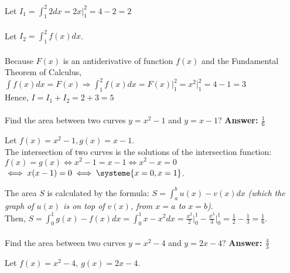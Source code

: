 \documentclass{article}
\begin{document}
    Let $\displaystyle I_1 = \int_{1}^{2} 2 dx = 2x\big|_1^2 = 4 - 2 = 2$\\\\

    Let $\displaystyle I_2 = \int_{1}^{2} f(x) dx$.\\\\

    Because $F(x)$ is an antiderivative of function $f(x)$ and the Fundamental Theorem of Calculus,\\

    $\displaystyle \int f(x) dx = F(x) \Rightarrow \int_{1}^{2} f(x) dx = F(x)\big|_1^2 = x^2\big|_1^2 = 4 - 1 = 3$\\

    Hence, $\displaystyle I = I_1 + I_2 = 2 + 3 = 5$

    \paragraph{\cite{33@116}} Find the area between two curves $y = x^2 - 1$ and $y = x - 1$? \textbf{Answer: $\displaystyle \frac{1}{6}$}

    Let $f(x) = x^2 - 1, g(x) = x - 1$.\\

    The intersection of two curves is the solutions of the intersection function:\\

    $\displaystyle f(x) = g(x) \iff x^2 - 1 = x - 1 \iff x^2 - x = 0$\\

    $\iff x(x - 1) = 0 \iff \systeme{x = 0, x = 1}$.

    The area $S$ is calculated by the formula: $\displaystyle S = \int_{a}^{b} u(x) - v(x) dx$ \textit{(which the graph of $u(x)$ is on top of $v(x)$, from $x = a$ to $x = b$)}.\\

    Then, $\displaystyle S = \int_{0}^{1} g(x) - f(x) dx = \int_{0}^{1} x - x^2 dx = \frac{x^2}{2}\big|_{0}^{1} - \frac{x^3}{3}\big|_{0}^{1} = \frac{1}{2} - \frac{1}{3} = \frac{1}{6}$.

    \paragraph{\cite{35@109}} Find the area between two curves $y = x^2 - 4$ and $y = 2x - 4$? \textbf{Answer: $\displaystyle \frac{4}{3}$}

    Let $f(x) = x^2 - 4,\ g(x) = 2x - 4$.\\
\end{document}
